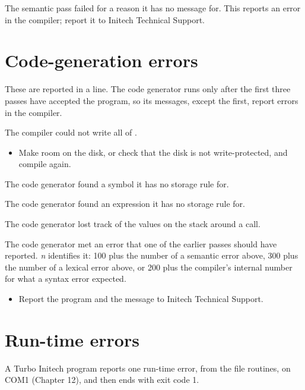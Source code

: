 
The semantic pass failed for a reason it has no message for.  This reports
an error in the compiler; report it to Initech Technical Support.

\section{Code-generation errors}
These are reported in a  line.  The code generator
runs only after the first three passes have accepted the program, so its
messages, except the first, report errors in the compiler.

The compiler could not write all of .
\begin{itemize}
\item Make room on the disk, or check that the disk is not write-protected,
  and compile again.
\end{itemize}

The code generator found a symbol it has no storage rule for.

The code generator found an expression it has no storage rule for.

The code generator lost track of the values on the stack around a call.

The code generator met an error that one of the earlier passes should have
reported.  \textit{n} identifies it: 100 plus the number of a semantic
error above, 300 plus the number of a lexical error above, or 200 plus the
compiler's internal number for what a syntax error expected.
\begin{itemize}
\item Report the program and the message to Initech Technical Support.
\end{itemize}

\section{Run-time errors}
A Turbo Initech program reports one run-time error, from the file
routines, on COM1 (Chapter 12), and then ends with exit code 1.


